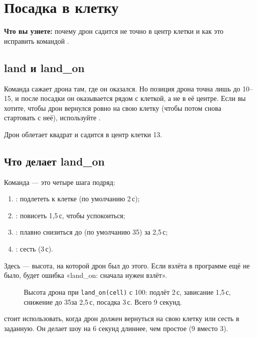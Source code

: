\chapter{Посадка в клетку}\label{ch:posadka}

\textbf{Что вы узнете:} почему дрон садится не точно в центр клетки и как это исправить командой .

\section{land и land\_on}

Команда  сажает дрона там, где он оказался. Но позиция дрона точна лишь до 10--15\cm, и после посадки он оказывается рядом с клеткой, а не в её центре. Если вы хотите, чтобы дрон вернулся ровно на свою клетку (чтобы потом снова стартовать с неё), используйте .


Дрон облетает квадрат и садится в центр клетки 13.

\section{Что делает land\_on}

Команда  — это четыре шага подряд:
\begin{enumerate}
  \item {}: подлететь к клетке (по умолчанию 2\,с);
  \item {}: повисеть 1,5\,с, чтобы успокоиться;
  \item {}: плавно снизиться до  (по умолчанию 35\cm) за 2,5\,с;
  \item {}: сесть (3\,с).
\end{enumerate}
Здесь  — высота, на которой дрон был до этого. Если взлёта в программе ещё не было, будет ошибка «land\_on: сначала нужен взлёт».

\begin{figure}[H]
  \centering
  
  \caption{Высота дрона при \texttt{land\_on(cell)} с 100\cm: подлёт 2\,с, зависание 1,5\,с, снижение до 35\cm за 2,5\,с, посадка 3\,с. Всего 9 секунд.}\label{fig:landon}
\end{figure}

\begin{zametka}
 стоит использовать, когда дрон должен вернуться на свою клетку или сесть в заданную. Он делает шоу на 6 секунд длиннее, чем простое  (9 вместо 3).
\end{zametka}

